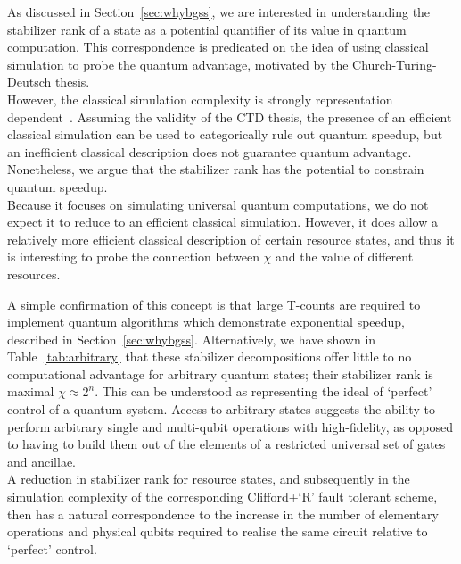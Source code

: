 \documentclass{standalone}
\begin{document}
As discussed in Section~\ref{sec:whybgss}, we are interested in understanding the stabilizer rank of a state as a potential quantifier of its value in quantum computation. This correspondence is predicated on the idea of using classical simulation to probe the quantum advantage, motivated by the Church-Turing-Deutsch thesis.\\
However, the classical simulation complexity is strongly representation dependent~\cite{Jozsa2003}. Assuming the validity of the CTD thesis, the presence of an efficient classical simulation can be used to categorically rule out quantum speedup, but an inefficient classical description does not guarantee quantum advantage. Nonetheless, we argue that the stabilizer rank has the potential to constrain quantum speedup.\\Because it focuses on simulating universal quantum computations, we do not expect it to reduce to an efficient classical simulation. However, it does allow a relatively more efficient classical description of certain resource states, and thus it is interesting to probe the connection between $\chi$ and the value of different resources. 
\par
A simple confirmation of this concept is that large T-counts are required to implement quantum algorithms which demonstrate exponential speedup, described in Section~\ref{sec:whybgss}. Alternatively, we have shown in Table~\ref{tab:arbitrary} that these stabilizer decompositions offer little to no computational advantage for arbitrary quantum states; their stabilizer rank is maximal $\chi\approx2^{n}$. This can be understood as representing the ideal of `perfect' control of a quantum system. Access to arbitrary states suggests the ability to perform arbitrary single and multi-qubit operations with high-fidelity, as opposed to having to build them out of the elements of a restricted universal set of gates and ancillae.\\
A reduction in stabilizer rank for resource states, and subsequently in the simulation complexity of the corresponding Clifford+`R' fault tolerant scheme, then has a natural correspondence to the increase in the number of elementary operations and physical qubits required to realise the same circuit relative to `perfect' control.
\par
\end{document}
